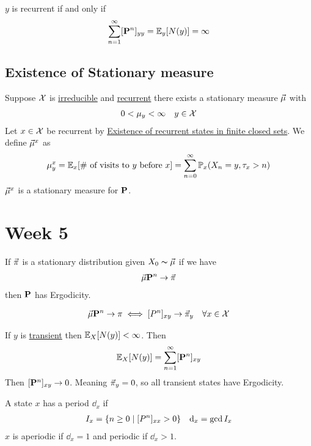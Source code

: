 \documentclass[12pt,a4paper]{article}
\begin{document}
\begin{thm}
$y$ is recurrent if and only if 
\begin{align*}
\sum\limits_{n=1}^{\infty} [\vb P^n]_{yy} = \mathbb{E}_y[N(y)] = \infty
\end{align*}
\end{thm}
\subsection{Existence of Stationary measure}
\begin{thm}
Suppose $\cal X$ is \hyperref[irreducible]{irreducible} and \hyperref[recurrent]{recurrent} there  exists a stationary measure $\va\mu$ with 
\begin{align*}
0<\mu_y < \infty && y\in \cal X
\end{align*}
Let $x\in \cal X$ be recurrent by \hyperref[finiteclosed]{Existence of recurrent states in finite closed sets}. We define $\va\mu^x$ as 
\begin{align*}
\mu_y^x = \mathbb{E}_x[\text{\# of visits to $y$ before $x$}] = \sum\limits_{n=0}^{\infty} \mathbb{P}_x(X_n = y, \tau_x > n)
\end{align*}
$\va\mu^x$ is a stationary measure for $\vb P$.
\end{thm}

\newpage
\section{Week 5}
\begin{defn}[Ergodicity]
If $\va\pi$ is a stationary distribution given $X_0 \thicksim \va\mu$  if we have 
\begin{align*}
\va\mu \vb P^n \rightarrow \va\pi
\end{align*}
then $\vb P$ has Ergodicity. 
\end{defn}
\begin{thm}
\begin{align*}
\va\mu \vb P^n \rightarrow \pi \iff [P^n]_{xy} \rightarrow \va\pi_y && \forall x\in \cal X
\end{align*}
\end{thm}
\begin{remark}
If $y$ is \hyperref[recurrent]{transient} then $\mathbb{E}_X[N(y)] < \infty$. Then 
\begin{align*}
\mathbb{E}_X[N(y)] = \sum\limits_{n=1}^{\infty} [\vb P^n]_{xy}
\end{align*}
Then $[\vb P^n]_{xy} \rightarrow 0$. Meaning $\va\pi_y = 0$, so all transient states have Ergodicity.
\end{remark}
\begin{defn}[Periodicity]
A state $x$ has a period $\dd_x$ if 
\begin{align*}
& I_x = \{n\geq 0 \;\vert\; [P^n]_{xx} > 0\}
&\dd_x = \gcd I_x 
\end{align*}
$x$ is {\color{deepred} aperiodic} if $\dd_x = 1$ and {\color{deepred} periodic} if $\dd_x > 1$.   
\end{defn}
\end{document}
